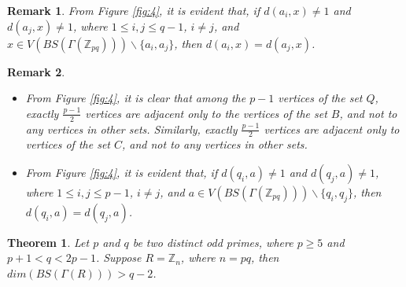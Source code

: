 \documentclass[10pt,a4paper]{amsart}
\newtheorem{remark}{Remark}
\newtheorem{theorem}{Theorem}
\begin{document}
\begin{remark}\label{22}
  From Figure \ref{fig:4}, it is evident that, if $d(a_i,x)\neq 1$ and $d(a_j,x) \neq 1$, where $1\leq i, j \leq q-1$, $i\neq j$, and $x\in V(BS(\Gamma(\mathbb{Z}_{pq})))\backslash\{a_i,a_j\}$, then $d(a_i,x)=d(a_j,x)$.     
 \end{remark}

 \begin{remark} \label{last} \quad \\
    \begin{itemize}
        \item From Figure \ref{fig:4}, it is clear that among the \( p-1 \) vertices of the set \( Q \), exactly \( \frac{p-1}{2} \) vertices are adjacent only to the vertices of the set \( B \), and not to any vertices in other sets. Similarly, exactly \( \frac{p-1}{2} \) vertices are adjacent only to vertices of the set \( C \), and not to any vertices in other sets.
    \item From Figure \ref{fig:4}, it is evident that, if $d(q_i,a)\neq 1$ and $d(q_j,a) \neq 1$, where $1\leq i, j \leq p-1$, $i\neq j$, and $a\in V(BS(\Gamma(\mathbb{Z}_{pq})))\backslash\{q_i,q_j\}$, then $d(q_i,a)=d(q_j,a)$.\\     
\end{itemize}
\end{remark}

\begin{theorem}
Let $p$ and $q$ be two distinct odd primes, where $p\geq 5$ and $p+1<q<2p-1$. Suppose $R=\mathbb{Z}_n$, where $n=pq$, then
$dim(BS(\Gamma(R))) > q-2$. 
 \end{theorem}
\end{document}
